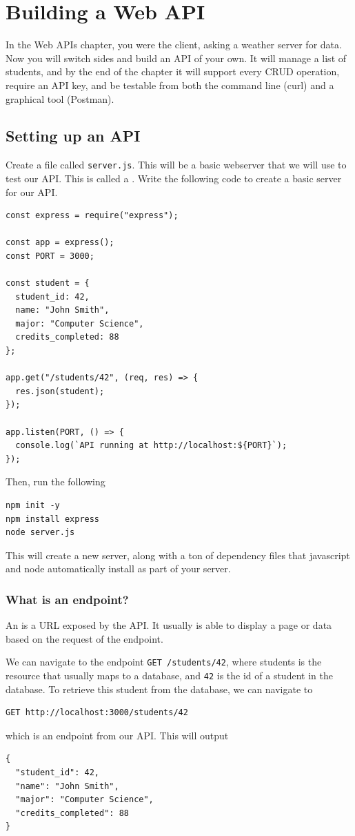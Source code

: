 \chapter{Building a Web API}


In the Web APIs chapter, you were the client, asking a weather server for data. Now you will switch sides and build an API of your own. It will manage a list of students,
and by the end of the chapter it will support every CRUD operation,
require an API key, and be testable from both the command line (curl)
and a graphical tool (Postman).

\section{Setting up an API}

Create a file called \texttt{server.js}. This will be a basic webserver that we will use to test our API. This is called a . Write the following code to create a basic server for our API.
\begin{verbatim}
const express = require("express");

const app = express();
const PORT = 3000;

const student = {
  student_id: 42,
  name: "John Smith",
  major: "Computer Science",
  credits_completed: 88
};

app.get("/students/42", (req, res) => {
  res.json(student);
});

app.listen(PORT, () => {
  console.log(`API running at http://localhost:${PORT}`);
});
\end{verbatim}
Then, run the following
\begin{verbatim}
npm init -y   
npm install express
node server.js
\end{verbatim}
This will create a new server, along with a ton of dependency files that javascript and 
node automatically install as part of your server.
\subsection{What is an endpoint?}
An  is a URL exposed by the API. It usually is able to display a page or 
data based on the request of the endpoint.

We can navigate to the endpoint \texttt{GET /students/42}, where students is the resource 
that usually maps to a database, and \texttt{42} is the id of a student in the database. 
To retrieve this student from the database, we can navigate to
\begin{verbatim}
GET http://localhost:3000/students/42
\end{verbatim}
which is an endpoint from our API. This will output
\begin{verbatim}
{
  "student_id": 42,
  "name": "John Smith",
  "major": "Computer Science",
  "credits_completed": 88
}
\end{verbatim}


